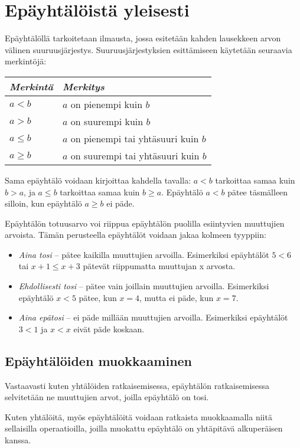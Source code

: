 \section{Epäyhtälöistä yleisesti}
Epäyhtälöllä tarkoitetaan ilmausta, jossa esitetään kahden lausekkeen arvon välinen suuruusjärjestys. Suuruusjärjestyksien esittämiseen käytetään seuraavia merkintöjä:

\begin{center}
\begin{tabular}{l|l}
\emph{Merkintä} & \emph{Merkitys} \\
\hline
$a<b$ &  $a$ on pienempi kuin $b$ \\
$a>b$ & $a$ on suurempi kuin $b$ \\
$a \leq b$ & $a$ on pienempi tai yhtäsuuri kuin $b$ \\
$a \geq b$ & $a$ on suurempi tai yhtäsuuri kuin $b$ \\
\end{tabular}
\end{center}

Sama epäyhtälö voidaan kirjoittaa kahdella tavalla: $a < b$ tarkoittaa samaa kuin $b > a$, ja $a \leq b$ tarkoittaa samaa kuin $b \geq a$. Epäyhtälö $a < b$ pätee täsmälleen silloin, kun epäyhtälö $a \geq b$ ei päde.

Epäyhtälön totuusarvo voi riippua epäyhtälön puolilla esiintyvien muuttujien arvoista. Tämän perusteella epäyhtälöt voidaan jakaa kolmeen tyyppiin:
\begin{itemize}
\item \emph{Aina tosi} -- pätee kaikilla muuttujien arvoilla. Esimerkiksi epäyhtälöt $5 < 6$ tai $x + 1 \leq x + 3$ pätevät riippumatta muuttujan x arvosta.
\item \emph{Ehdollisesti tosi} -- pätee vain joillain muuttujien arvoilla. Esimerkiksi epäyhtälö $x < 5$ pätee, kun $x = 4$, mutta ei päde, kun $x = 7$.
\item \emph{Aina epätosi} -- ei päde millään muuttujien arvoilla. Esimerkiksi epäyhtälöt $3 < 1$ ja $x < x$ eivät päde koskaan.
\end{itemize}

\subsection*{Epäyhtälöiden muokkaaminen}
Vastaavasti kuten yhtälöiden ratkaisemisessa, epäyhtälön ratkaisemisessa selvitetään ne muuttujien arvot, joilla epäyhtälö on tosi.

Kuten yhtälöitä, myös epäyhtälöitä voidaan ratkaista muokkaamalla niitä sellaisilla operaatioilla, joilla muokattu epäyhtälö on yhtäpitävä alkuperäisen kanssa.

